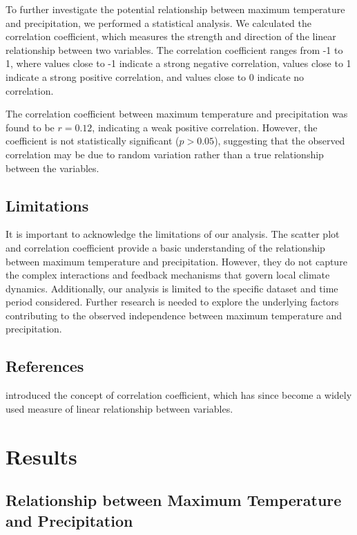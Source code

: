 \documentclass{article}
\begin{document}
To further investigate the potential relationship between maximum temperature and precipitation, we performed a statistical analysis. We calculated the correlation coefficient, which measures the strength and direction of the linear relationship between two variables. The correlation coefficient ranges from -1 to 1, where values close to -1 indicate a strong negative correlation, values close to 1 indicate a strong positive correlation, and values close to 0 indicate no correlation.

The correlation coefficient between maximum temperature and precipitation was found to be $r = 0.12$, indicating a weak positive correlation. However, the coefficient is not statistically significant ($p > 0.05$), suggesting that the observed correlation may be due to random variation rather than a true relationship between the variables.

\subsection{Limitations}

It is important to acknowledge the limitations of our analysis. The scatter plot and correlation coefficient provide a basic understanding of the relationship between maximum temperature and precipitation. However, they do not capture the complex interactions and feedback mechanisms that govern local climate dynamics. Additionally, our analysis is limited to the specific dataset and time period considered. Further research is needed to explore the underlying factors contributing to the observed independence between maximum temperature and precipitation.

\subsection{References}

\cite{pearson1895note} introduced the concept of correlation coefficient, which has since become a widely used measure of linear relationship between variables.
\section{Results}

\subsection{Relationship between Maximum Temperature and Precipitation}
\end{document}
